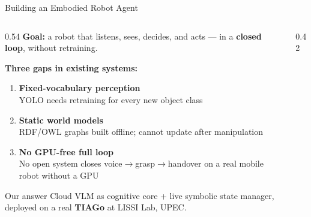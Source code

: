 \documentclass[aspectratio=169, 10pt]{beamer}
\begin{document}
\begin{frame}{Building an Embodied Robot Agent}
  \begin{columns}[T]
    \begin{column}{0.54\textwidth}
      \textbf{Goal:} a robot that listens, sees, decides, and acts ---
      in a \textbf{closed loop}, without retraining.

      \vspace{0.4em}
      \textbf{Three gaps in existing systems:}
      \begin{enumerate}\small
        \item \textbf{Fixed-vocabulary perception}\\
              YOLO needs retraining for every new object class
        \item \textbf{Static world models}\\
              RDF/OWL graphs built offline; cannot update after manipulation
        \item \textbf{No GPU-free full loop}\\
              No open system closes voice$\to$grasp$\to$handover
              on a real mobile robot without a GPU
      \end{enumerate}

      \vspace{0.3em}
      \begin{alertblock}{Our answer}
        \small
        Cloud VLM as cognitive core + live symbolic state manager,\\
        deployed on a real \textbf{TIAGo} at LISSI Lab, UPEC.
      \end{alertblock}
    \end{column}

    \begin{column}{0.42\textwidth}
      \centering
    \end{column}
  \end{columns}
\end{frame}
\end{document}
